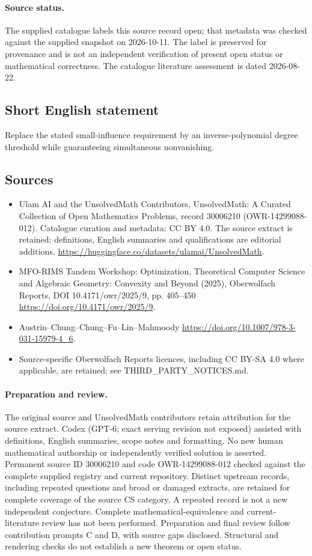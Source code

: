 \documentclass[11pt]{article}
\begin{document}
\paragraph{Source status.}
The supplied catalogue labels this source record open; that metadata was checked against the supplied snapshot on 2026-10-11. The label is preserved for provenance and is not an independent verification of present open status or mathematical correctness. The catalogue literature assessment is dated 2026-08-22.
\subsection{Short English statement}
Replace the stated small-influence requirement by an inverse-polynomial degree threshold while guaranteeing simultaneous nonvanishing.
\subsection{Sources}
\begin{itemize}
\item[\hypertarget{source:30006210:1}{S1}] Ulam AI and the UnsolvedMath Contributors, UnsolvedMath: A Curated Collection of Open Mathematics Problems, record 30006210 (OWR-14299088-012). Catalogue curation and metadata: CC BY 4.0. The source extract is retained; definitions, English summaries and qualifications are editorial additions.
\url{https://huggingface.co/datasets/ulamai/UnsolvedMath}.
\item[\hypertarget{source:30006210:2}{S2}] MFO-RIMS Tandem Workshop: Optimization, Theoretical Computer Science and Algebraic Geometry: Convexity and Beyond (2025), Oberwolfach Reports, DOI 10.4171/owr/2025/9, pp. 405--450
\url{https://doi.org/10.4171/owr/2025/9}.
\item[\hypertarget{source:30006210:3}{S3}] Austrin--Chung--Chung--Fu--Lin--Mahmoody
\url{https://doi.org/10.1007/978-3-031-15979-4_6}.
\item Source-specific Oberwolfach Reports licences, including CC BY-SA 4.0 where applicable, are retained; see THIRD\_PARTY\_NOTICES.md.
\end{itemize}
\paragraph{Preparation and review.}
The original source and UnsolvedMath contributors retain attribution for the source extract. Codex (GPT-6; exact serving revision not exposed) assisted with definitions, English summaries, scope notes and formatting. No new human mathematical authorship or independently verified solution is asserted. Permanent source ID 30006210 and code OWR-14299088-012 checked against the complete supplied registry and current repository. Distinct upstream records, including repeated questions and broad or damaged extracts, are retained for complete coverage of the source CS category. A repeated record is not a new independent conjecture. Complete mathematical-equivalence and current-literature review has not been performed. Preparation and final review follow contribution prompts C and D, with source gaps disclosed. Structural and rendering checks do not establish a new theorem or open status.
\label{end:30006210}
\end{document}
